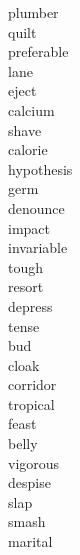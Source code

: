 \documentclass[a4paper, 11pt]{ctexart}
\begin{document}
\begin{multicols*}{3}
\begin{description}
\item[plumber]

\item[quilt]

\item[preferable]

\item[lane]

\item[eject]

\item[calcium]

\item[shave]

\item[calorie]

\item[hypothesis]

\item[germ]

\item[denounce]

\item[impact]

\item[invariable]

\item[tough]

\item[resort]

\item[depress]

\item[tense]

\item[bud]

\item[cloak]

\item[corridor]

\item[tropical]

\item[feast]

\item[belly]

\item[vigorous]

\item[despise]

\item[slap]

\item[smash]

\item[marital]


\end{description}
\end{multicols*}
\end{document}
